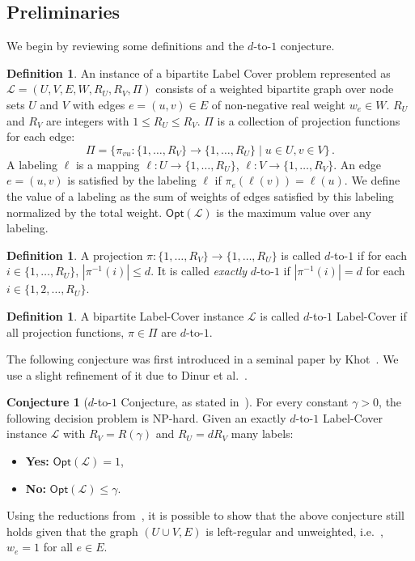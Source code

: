 \documentclass[10pt]{article}
\theoremstyle{definition}
\newtheorem{definition}[theorem]{Definition}
\providecommand{\ie}{i.e.\ }
\newtheorem{conjecture}[theorem]{Conjecture}
\numberwithin{equation}{section}
\newcommand{\opt}{\mathsf{Opt}}
\newcommand{\dtoone}[1]{{\sf ${#1}$-to-$1$}}
\newcommand{\intset}[1]{\ensuremath{\{1,\ldots,{#1}\}}}
\newcommand{\cclass}[1]{\textsf{#1}}
\renewcommand{\le}{\leqslant}
\begin{document}
\subsection{Preliminaries}
\label{sec:condhardness}
%
We begin by reviewing some definitions
%
and the \dtoone{d} conjecture.
%
\begin{definition}
  An instance of a bipartite Label Cover problem represented as
  $\mathcal{L} = (U, V, E, W, R_U, R_V, \Pi)$ consists of a weighted
  bipartite graph over node sets $U$ and $V$ with edges $e=(u,v) \in
  E$ of non-negative real weight $w_e \in W$. $R_U$ and $R_V$ are
  integers with $1\le R_U\le R_V$. $\Pi$ is a collection of projection
  functions for each edge:
  \[
  \Pi=\{\pi_{vu}:\intset{R_V}\rightarrow\intset{R_U}\;\big|\;u\in U, v\in
  V\}\,.
  \]
  A labeling $\ell$ is a mapping $\ell:U\rightarrow
  \intset{R_U}$, $\ell:V\rightarrow \intset{R_V}$. An edge $e=(u,v)$
  is satisfied by the labeling $\ell$ if $\pi_e(\ell(v))=\ell(u)$. We
  define the value of a labeling as the sum of weights of edges
  satisfied by this labeling normalized by the total
  weight. $\opt(\mathcal{L})$ is the maximum value over any labeling.
\end{definition}
%
%
\begin{definition}
  A projection $\pi:\intset{R_V}\rightarrow \intset{R_U}$ is called
  \dtoone{d} if for each $i \in \intset{R_U}$, $|\pi^{-1}(i)|\le
  d$. It is called \emph{exactly} \dtoone{d} if $|\pi^{-1}(i)|= d$ for
  each $i \in \{1,2,\dots,R_U\}$.
\end{definition}
%
%
\begin{definition}
  A bipartite Label-Cover instance $\mathcal{L}$ is called $d$-to-$1$
  Label-Cover if all projection functions, $\pi \in \Pi$ are
  $d$-to-$1$.
\end{definition}
%
The following conjecture was first introduced in a seminal paper by
Khot~\cite{Khot02}. We use a slight refinement of it due to
Dinur et al.~\cite{DMR}.
\begin{conjecture}[\dtoone{d} Conjecture, as stated in~\cite{DMR}]
  For every constant $\gamma > 0$, the following decision problem is \cclass{NP}-hard.
  Given an exactly \dtoone{d} Label-Cover instance
  $\mathcal{L}$ with $R_V=R(\gamma)$ and $R_U = d R_V$ many labels:
  \begin{itemize}
  \item {\bf Yes:} $\opt(\mathcal{L}) = 1$,
  \item {\bf No:} $\opt(\mathcal{L})\le \gamma$.
  \end{itemize}
%
%
%
%
%
%
\label{conj:dtoone}
\end{conjecture}
%
Using the reductions from~\cite{DMR}, it is possible to show that the
above conjecture still holds given that the graph $(U\cup V, E)$ is
left-regular and unweighted, \ie, $w_e = 1$ for all $e\in E$.
%
\end{document}
